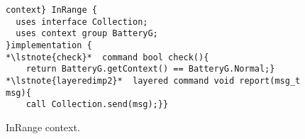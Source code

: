 \begin{figure}[!tb]
\begin{lstlisting}[style=conescframe]
context} InRange {
  uses interface Collection;
  uses context group BatteryG; 
}implementation {
*\lstnote{check}*  command bool check(){
    return BatteryG.getContext() == BatteryG.Normal;}
*\lstnote{layeredimp2}*  layered command void report(msg_t msg){
    call Collection.send(msg);}}
\end{lstlisting}
\vspace{-4mm}
\caption{InRange context.}
  \label{fig:irc}
\vspace{-2mm}
\end{figure}